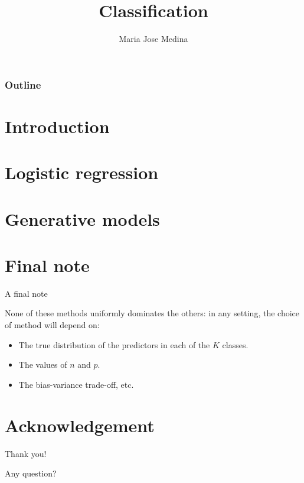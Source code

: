 \documentclass[10pt]{beamer}
\title{Classification}%
\author[Maria Jose Medina]{Maria Jose Medina}%
\institute[USACH]{Universidad de Santiago de Chile}
\date[\textcolor{white}{September 2022}]
\begin{document}
\frame{\titlepage}
\begin{frame}
\frametitle{Outline}
\tableofcontents
\end{frame}



\section{Introduction}



\section{Logistic regression}


\section{Generative models}


\section*{Final note}
\begin{frame}
\begin{block}{A final note}

    None of these methods uniformly dominates the others: in any setting, the choice of method will depend on: \pause 

\begin{itemize}
    \item The true distribution of the predictors in each of the $K$ classes. \pause
    \item The values of $n$ and $p$. \pause 
    \item The bias-variance trade-oﬀ, etc.
\end{itemize}
\end{block}
    
\end{frame}


\section*{Acknowledgement}  
\begin{frame}

\textcolor{myNewColorA}{\huge{\centerline{Thank you!}}}
\vspace*{0.5cm}

\textcolor{myNewColorA}{\Large{\centerline{Any question?}}}
\vspace*{0.5cm}


\end{frame}
\end{document}

